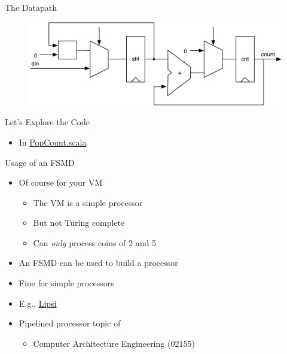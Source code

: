\begin{frame}[fragile]{The Datapath}
\begin{figure}
  \includegraphics[scale=0.65]{../figures/popcnt-data}
\end{figure}
\end{frame}

\begin{frame}[fragile]{Let's Explore the Code}
\begin{itemize}
\item In \href{https://github.com/schoeberl/chisel-book/blob/master/src/main/scala/PopCount.scala}{PopCount.scala}
\end{itemize}
\end{frame}

\begin{frame}[fragile]{Usage of an FSMD}
\begin{itemize}
\item Of course for your VM
\begin{itemize}
\item The VM is a simple processor
\item But not Turing complete
\item Can \emph{only} process coins of 2 and 5
\end{itemize}
\item An FSMD can be used to build a processor
\item Fine for simple processors
\item E.g., \href{https://github.com/schoeberl/lipsi}{Lipsi}
\item Pipelined processor topic of
\begin{itemize}
\item Computer Architecture Engineering (02155)
\end{itemize}\end{itemize}
\end{frame}

